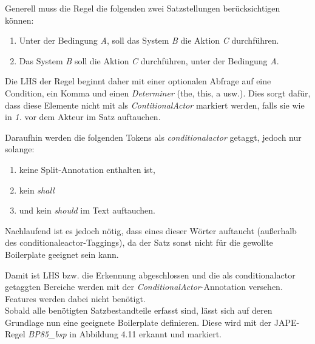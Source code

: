 \documentclass[12pt]{report}
\begin{document}
Generell muss die Regel die folgenden zwei Satzstellungen berücksichtigen können: 
\begin{enumerate}
\item Unter der Bedingung \textit{A}, soll das System \textit{B} die Aktion \textit{C} durchführen.
\item Das System \textit{B} soll die Aktion \textit{C} durchführen, unter der Bedingung \textit{A}.
\end{enumerate}
Die LHS der Regel beginnt daher mit einer optionalen Abfrage auf eine Condition, ein Komma und einen \textit{Determiner} (the, this, a usw.). Dies sorgt dafür, dass diese Elemente nicht mit als \textit{ContitionalActor} markiert werden, falls sie wie in \textit{1.} vor dem Akteur im Satz auftauchen. 

Daraufhin werden die folgenden Tokens als \textit{conditionalactor} getaggt, jedoch nur solange:
\begin{enumerate}
\item keine Split-Annotation enthalten ist,
\item kein \textit{shall}
\item und kein \textit{should} im Text auftauchen.
\end{enumerate}

Nachlaufend ist es jedoch nötig, dass eines dieser Wörter auftaucht (außerhalb des conditionaleactor-Taggings), da der Satz sonst nicht für die gewollte Boilerplate geeignet sein kann.

Damit ist LHS bzw. die Erkennung abgeschlossen und die als conditionalactor getaggten Bereiche werden mit der \textit{ConditionalActor}-Annotation versehen. Features werden dabei nicht benötigt. \\

Sobald alle benötigten Satzbestandteile erfasst sind, lässt sich auf deren Grundlage nun eine geeignete Boilerplate definieren. Diese wird mit der JAPE-Regel \textit{BP85\_bsp} in Abbildung 4.11 erkannt und markiert. 
\end{document}
